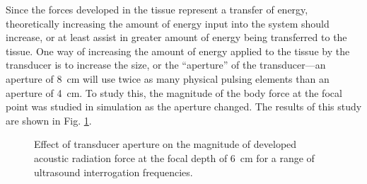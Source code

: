 			Since the forces developed in the tissue represent a transfer of energy, theoretically increasing the amount of energy input into the system should increase, or at least assist in greater amount of energy being transferred to the tissue. One way of increasing the amount of energy applied to the tissue by the transducer is to increase the size, or the ``aperture'' of the transducer---an aperture of \SI{8}{\cm} will use twice as many physical pulsing elements than an aperture of \SI{4}{\cm}. To study this, the magnitude of the body force at the focal point was studied in simulation as the aperture changed. The results of this study are shown in Fig. \ref{fig:trans-width-force}.

			\begin{figure}[!htb]
				\centering
				\caption[Effect of transducer aperture on the magnitude of acoustic radiation force]{Effect of transducer aperture on the magnitude of developed acoustic radiation force at the focal depth of \SI{6}{\cm} for a range of ultrasound interrogation frequencies.}
				\label{fig:trans-width-force}
			\end{figure}

